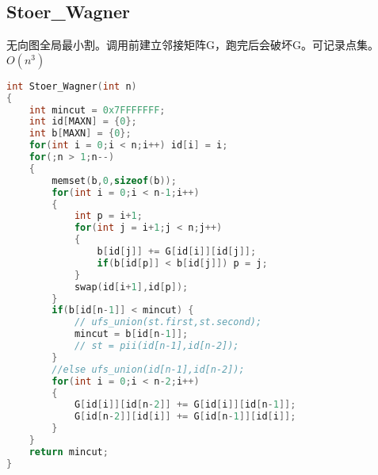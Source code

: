 \subsection{Stoer\_Wagner}
无向图全局最小割。调用前建立邻接矩阵G，跑完后会破坏G。可记录点集。$O(n^3)$ 
\begin{lstlisting}[language=C++]
int Stoer_Wagner(int n)
{
	int mincut = 0x7FFFFFFF;
	int id[MAXN] = {0};
	int b[MAXN] = {0};
	for(int i = 0;i < n;i++) id[i] = i;
	for(;n > 1;n--)
	{
		memset(b,0,sizeof(b));
		for(int i = 0;i < n-1;i++)
		{
			int p = i+1;
			for(int j = i+1;j < n;j++)
			{
				b[id[j]] += G[id[i]][id[j]];
				if(b[id[p]] < b[id[j]]) p = j;
			}
			swap(id[i+1],id[p]);
		}
		if(b[id[n-1]] < mincut) {
			// ufs_union(st.first,st.second);
			mincut = b[id[n-1]];
			// st = pii(id[n-1],id[n-2]);
		}
		//else ufs_union(id[n-1],id[n-2]);
		for(int i = 0;i < n-2;i++)
		{
			G[id[i]][id[n-2]] += G[id[i]][id[n-1]];
			G[id[n-2]][id[i]] += G[id[n-1]][id[i]];
		}
	}
	return mincut;
}
\end{lstlisting}
